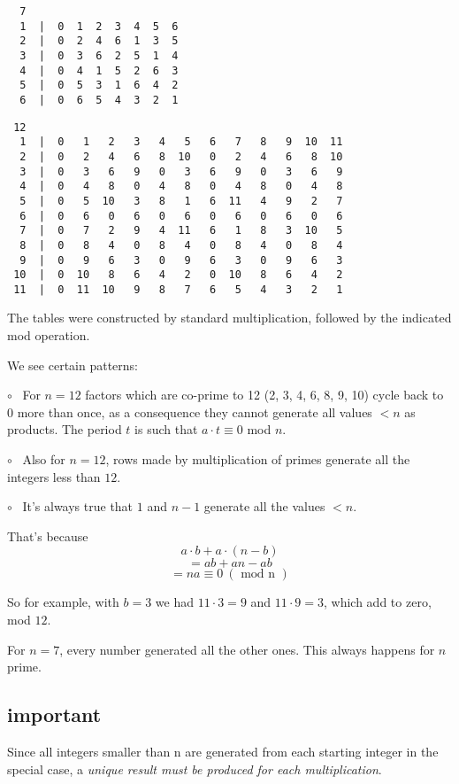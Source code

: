 \documentclass[11pt, oneside]{article}
\begin{document}
\begin{verbatim}
  7
  1  |  0  1  2  3  4  5  6
  2  |  0  2  4  6  1  3  5
  3  |  0  3  6  2  5  1  4
  4  |  0  4  1  5  2  6  3
  5  |  0  5  3  1  6  4  2
  6  |  0  6  5  4  3  2  1
\end{verbatim}

\begin{verbatim}
 12
  1  |  0   1   2   3   4   5   6   7   8   9  10  11
  2  |  0   2   4   6   8  10   0   2   4   6   8  10
  3  |  0   3   6   9   0   3   6   9   0   3   6   9
  4  |  0   4   8   0   4   8   0   4   8   0   4   8
  5  |  0   5  10   3   8   1   6  11   4   9   2   7
  6  |  0   6   0   6   0   6   0   6   0   6   0   6
  7  |  0   7   2   9   4  11   6   1   8   3  10   5
  8  |  0   8   4   0   8   4   0   8   4   0   8   4
  9  |  0   9   6   3   0   9   6   3   0   9   6   3
 10  |  0  10   8   6   4   2   0  10   8   6   4   2 
 11  |  0  11  10   9   8   7   6   5   4   3   2   1 
\end{verbatim}

The tables were constructed by standard multiplication, followed by the indicated mod operation.

We see certain patterns:  

$\circ$ \ For $n = 12$ factors which are co-prime to 12 (2, 3, 4, 6, 8, 9, 10) cycle back to $0$ more than once, as a consequence they cannot generate all values $< n$ as products.  The period $t$ is such that $a \cdot t \equiv 0$ mod $n$.

$\circ$ \ Also for $n=12$, rows made by multiplication of primes generate all the integers less than $12$.  

$\circ$ \ It's always true that $1$ and $n-1$ generate all the values $< n$.  

That's because
\[ a \cdot b + a \cdot (n-b) \]
\[ = ab + an - ab \]
\[ = na \equiv 0 \ (\text{ mod n }) \]

So for example, with $b=3$ we had $11 \cdot 3 = 9$ and $11 \cdot 9 = 3$, which add to zero, mod $12$.

For $n = 7$, every number generated all the other ones.  This always happens for $n$ prime.

\subsection*{important}

Since all integers smaller than n are generated from each starting integer in the special case, a \emph{unique result must be produced for each multiplication}.
\end{document}
